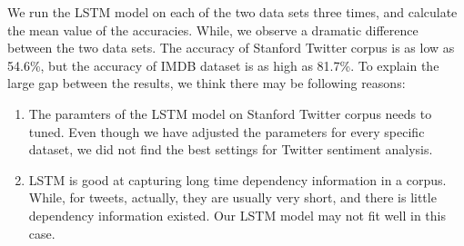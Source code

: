 We run the LSTM model on each of the two data sets three times, and calculate the mean value of the accuracies. While, we observe a dramatic difference between the two data sets. The accuracy of Stanford Twitter corpus is as low as 54.6\%, but the accuracy of IMDB dataset is as high as 81.7\%. To explain the large gap between the results, we think there may be following reasons:

\begin{enumerate}
\item The paramters of the LSTM model on Stanford Twitter corpus needs to tuned. Even though we have adjusted the parameters for every specific dataset, we did not find the best settings for Twitter sentiment analysis.
\item LSTM is good at capturing long time dependency information in a corpus. While, for tweets, actually, they are usually very short, and there is little dependency information existed. Our LSTM model may not fit well in this case.
\end{enumerate}





